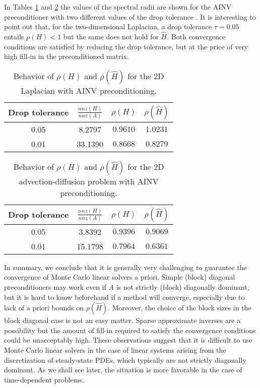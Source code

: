 \documentclass[final,leqno,onefignum,onetabnum]{siamltex1213}
\begin{document}
In Tables \ref{tab:lap2d_ainv} and \ref{tab:ifiss_ainv} the values of
the spectral radii are shown for the AINV
preconditioner with two different values of the drop tolerance
\cite{BMT1996,BT1998}. It is interesting to point out that, for the
two-dimensional
Laplacian, a drop tolerance $\tau=0.05$ entails $\rho(H)<1$ but the same does
not hold for $\hat{H}$. Both convergence conditions are satisfied by
reducing the drop tolerance, but at the price of very high fill-in in the
preconditioned matrix.


\begin{table}[!t]
\centering
\begin{tabular}{|c|c|c|c|}
\hline
\textbf{Drop tolerance} & \textbf{$\frac{nnz(H)}{nnz(A)}$}& $\rho(H)$
&$\rho(\hat{H})$\\
\hline
 0.05 & 8.2797 & $0.9610$ & $1.0231$\\
\hline
 0.01 & 33.1390 & $0.8668$ & $0.8279$\\
\hline
\end{tabular}
\caption{Behavior of $\rho(H)$ and $\rho(\hat{H})$ for the
2D Laplacian with AINV preconditioning.}
\label{tab:lap2d_ainv}
\end{table}

\begin{table}[!t]
\centering
\begin{tabular}{|c|c|c|c|}
\hline
\textbf{Drop tolerance} & \textbf{$\frac{nnz(H)}{nnz(A)}$}& $\rho(H)$
&$\rho(\hat{H})$\\
\hline
 0.05 & 3.8392 & $0.9396$ & $0.9069$\\
\hline
 0.01 & 15.1798 & $0.7964$ & $0.6361$\\
\hline
\end{tabular}
\caption{Behavior of $\rho(H)$ and $\rho(\hat{H})$ for the 2D
advection-diffusion problem with AINV preconditioning.}
\label{tab:ifiss_ainv}
\end{table}

In summary, we conclude that it is generally very challenging to guarantee
the convergence of Monte Carlo linear solvers a priori. Simple (block) diagonal
preconditioners may work even if $A$ is not strictly (block)
diagonally dominant, but it is hard to know beforehand if a method will converge,
especially due to lack of a priori bounds on $\rho(\hat{H})$.
Moreover, the choice of the block sizes in the block diagonal case
is not an easy matter. Sparse approximate inverses are a possibility
but the amount of fill-in required to satisfy the
convergence conditions could be unacceptably high. These observations
suggest that it is difficult to use Monte Carlo linear solvers in the
case of linear systems arising from the discretization of steady-state
PDEs, which typically are not strictly diagonally dominant.
As we shall see later, the situation is more favorable in the case of
time-dependent problems.
\end{document}
